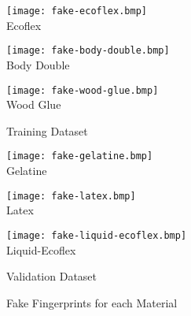
\begin{figure}[!htb]
    \begin{minipage}[r]{0.5\textwidth}
        \begin{minipage}[r]{0.3\textwidth}
            \centering
            \texttt{[image: fake-ecoflex.bmp]}
            \vspace{-5mm} \\ Ecoflex
        \end{minipage}
        \begin{minipage}[r]{0.3\textwidth}
            \centering
            \texttt{[image: fake-body-double.bmp]}
            \vspace{-5mm} \\ Body Double
        \end{minipage}
        \begin{minipage}[r]{0.3\textwidth}
            \centering
            \texttt{[image: fake-wood-glue.bmp]}
            \vspace{-5mm} \\ Wood Glue
        \end{minipage}
        \caption{Training Dataset}
    \end{minipage}
    \vrule
    \begin{minipage}[r]{0.5\textwidth}
        \begin{minipage}[r]{0.3\textwidth}
            \centering
            \texttt{[image: fake-gelatine.bmp]}
            \vspace{-5mm} \\ Gelatine
        \end{minipage}
        \begin{minipage}[r]{0.3\textwidth}
            \centering
            \texttt{[image: fake-latex.bmp]}
            \vspace{-5mm} \\ Latex
        \end{minipage}
        \begin{minipage}[r]{0.3\textwidth}
            \centering
            \texttt{[image: fake-liquid-ecoflex.bmp]}
            \vspace{-5mm} \\ Liquid-Ecoflex
        \end{minipage}
        \caption{Validation Dataset}
    \end{minipage}

    \caption{Fake Fingerprints for each Material}
    \label{fig:fake_fingers}
\end{figure}